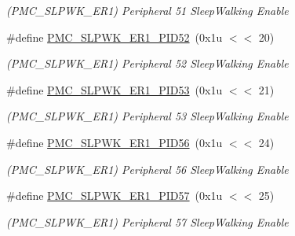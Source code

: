 \begin{DoxyCompactItemize}
\begin{DoxyCompactList}\small\item\em (P\+M\+C\+\_\+\+S\+L\+P\+W\+K\+\_\+\+E\+R1) Peripheral 51 Sleep\+Walking Enable \end{DoxyCompactList}\item 
\mbox{\label{group__SAMV71__PMC_ga86c00b4ba113acdbff47547443c88252}} 
\#define \mbox{\hyperlink{group__SAMV71__PMC_ga86c00b4ba113acdbff47547443c88252}{P\+M\+C\+\_\+\+S\+L\+P\+W\+K\+\_\+\+E\+R1\+\_\+\+P\+I\+D52}}~(0x1u $<$$<$ 20)
\begin{DoxyCompactList}\small\item\em (P\+M\+C\+\_\+\+S\+L\+P\+W\+K\+\_\+\+E\+R1) Peripheral 52 Sleep\+Walking Enable \end{DoxyCompactList}\item 
\mbox{\label{group__SAMV71__PMC_gaf34707cc2f73df5e1a0d681c342273ef}} 
\#define \mbox{\hyperlink{group__SAMV71__PMC_gaf34707cc2f73df5e1a0d681c342273ef}{P\+M\+C\+\_\+\+S\+L\+P\+W\+K\+\_\+\+E\+R1\+\_\+\+P\+I\+D53}}~(0x1u $<$$<$ 21)
\begin{DoxyCompactList}\small\item\em (P\+M\+C\+\_\+\+S\+L\+P\+W\+K\+\_\+\+E\+R1) Peripheral 53 Sleep\+Walking Enable \end{DoxyCompactList}\item 
\mbox{\label{group__SAMV71__PMC_ga9792ce89c425d8a5f48138e4c2d9207a}} 
\#define \mbox{\hyperlink{group__SAMV71__PMC_ga9792ce89c425d8a5f48138e4c2d9207a}{P\+M\+C\+\_\+\+S\+L\+P\+W\+K\+\_\+\+E\+R1\+\_\+\+P\+I\+D56}}~(0x1u $<$$<$ 24)
\begin{DoxyCompactList}\small\item\em (P\+M\+C\+\_\+\+S\+L\+P\+W\+K\+\_\+\+E\+R1) Peripheral 56 Sleep\+Walking Enable \end{DoxyCompactList}\item 
\mbox{\label{group__SAMV71__PMC_gab571b69744492177d28d2cd369fc9557}} 
\#define \mbox{\hyperlink{group__SAMV71__PMC_gab571b69744492177d28d2cd369fc9557}{P\+M\+C\+\_\+\+S\+L\+P\+W\+K\+\_\+\+E\+R1\+\_\+\+P\+I\+D57}}~(0x1u $<$$<$ 25)
\begin{DoxyCompactList}\small\item\em (P\+M\+C\+\_\+\+S\+L\+P\+W\+K\+\_\+\+E\+R1) Peripheral 57 Sleep\+Walking Enable \end{DoxyCompactList}\item 

\end{DoxyCompactItemize}
